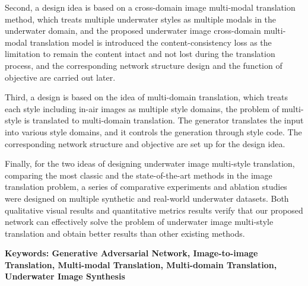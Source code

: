 {Second, a design idea is based on a cross-domain image multi-modal translation method, which treats multiple underwater styles as multiple modals in the underwater domain, and the proposed underwater image cross-domain multi-modal translation model is introduced the content-consistency loss as the limitation to remain the content intact and not lost during the translation process, and the corresponding network structure design and the function of objective are carried out later.

Third, a design is based on the idea of multi-domain translation, which treats each style including in-air images as multiple style domains, the problem of multi-style is translated to multi-domain translation. The generator translates the input into various style domains,  and it controls the generation through style code. The corresponding network structure and objective are set up for the design idea.

Finally, for the two ideas of designing underwater image multi-style translation, comparing the most classic and the state-of-the-art methods in the image translation problem, a series of comparative experiments and ablation studies were designed on multiple synthetic and real-world underwater datasets. Both qualitative visual results and quantitative metrics results verify that our proposed network can effectively solve the problem of underwater image multi-style translation and obtain better results than other existing methods.

}
 
\vskip12bp
{\xiaosi\heiti\noindent 
\textbf{Keywords: Generative Adversarial Network, Image-to-image Translation, Multi-modal Translation, Multi-domain Translation, Underwater Image Synthesis}}
